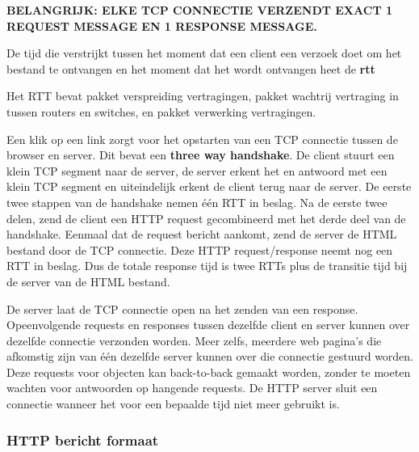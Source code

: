 \noindent \textbf{BELANGRIJK: ELKE TCP CONNECTIE VERZENDT EXACT 1 REQUEST MESSAGE EN 1 RESPONSE MESSAGE.}

\noindent De tijd die verstrijkt tussen het moment dat een client een verzoek doet om het bestand te ontvangen en het moment dat het wordt ontvangen heet de \textbf{\acrfull{rtt}}

\noindent Het RTT bevat pakket verspreiding vertragingen, pakket wachtrij vertraging in tussen routers en switches, en pakket verwerking vertragingen.

\noindent Een klik op een link zorgt voor het opstarten van een TCP connectie tussen de browser en server. Dit bevat een \textbf{three way handshake}. De client stuurt een klein TCP segment naar de server, de server erkent het en antwoord met een klein TCP segment en uiteindelijk erkent de client terug naar de server. De eerste twee stappen van de handshake nemen één RTT in beslag. Na de eerste twee delen, zend de client een HTTP request gecombineerd met het derde deel van de handshake. Eenmaal dat de request bericht aankomt, zend de server de HTML bestand door de TCP connectie. Deze HTTP request/response neemt nog een RTT in beslag. Dus de totale response tijd is twee RTTs plus de transitie tijd bij de server van de HTML bestand.


De server laat de TCP connectie open na het zenden van een response. Opeenvolgende requests en responses tussen dezelfde client en server kunnen over dezelfde connectie verzonden worden. Meer zelfs, meerdere web pagina’s die afkomstig zijn van één dezelfde server kunnen over die connectie gestuurd worden. Deze requests voor objecten kan back-to-back gemaakt worden, zonder te moeten wachten voor antwoorden op hangende requests. De HTTP server sluit een connectie wanneer het voor een bepaalde tijd niet meer gebruikt is.

\subsubsection{HTTP bericht formaat}


